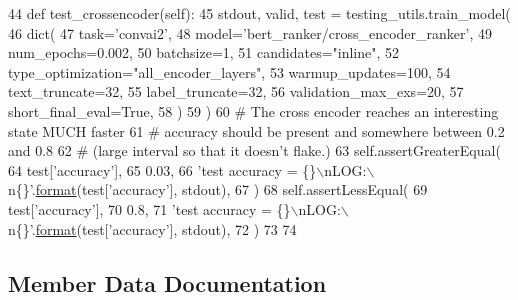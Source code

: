 \begin{DoxyCode}
44     \textcolor{keyword}{def }test\_crossencoder(self):
45         stdout, valid, test = testing\_utils.train\_model(
46             dict(
47                 task=\textcolor{stringliteral}{'convai2'},
48                 model=\textcolor{stringliteral}{'bert\_ranker/cross\_encoder\_ranker'},
49                 num\_epochs=0.002,
50                 batchsize=1,
51                 candidates=\textcolor{stringliteral}{"inline"},
52                 type\_optimization=\textcolor{stringliteral}{"all\_encoder\_layers"},
53                 warmup\_updates=100,
54                 text\_truncate=32,
55                 label\_truncate=32,
56                 validation\_max\_exs=20,
57                 short\_final\_eval=\textcolor{keyword}{True},
58             )
59         )
60         \textcolor{comment}{# The cross encoder reaches an interesting state MUCH faster}
61         \textcolor{comment}{# accuracy should be present and somewhere between 0.2 and 0.8}
62         \textcolor{comment}{# (large interval so that it doesn't flake.)}
63         self.assertGreaterEqual(
64             test[\textcolor{stringliteral}{'accuracy'}],
65             0.03,
66             \textcolor{stringliteral}{'test accuracy = \{\}\(\backslash\)nLOG:\(\backslash\)n\{\}'}.\hyperlink{namespaceparlai_1_1chat__service_1_1services_1_1messenger_1_1shared__utils_a32e2e2022b824fbaf80c747160b52a76}{format}(test[\textcolor{stringliteral}{'accuracy'}], stdout),
67         )
68         self.assertLessEqual(
69             test[\textcolor{stringliteral}{'accuracy'}],
70             0.8,
71             \textcolor{stringliteral}{'test accuracy = \{\}\(\backslash\)nLOG:\(\backslash\)n\{\}'}.\hyperlink{namespaceparlai_1_1chat__service_1_1services_1_1messenger_1_1shared__utils_a32e2e2022b824fbaf80c747160b52a76}{format}(test[\textcolor{stringliteral}{'accuracy'}], stdout),
72         )
73 
74 
\end{DoxyCode}


\subsection{Member Data Documentation}
\mbox{\label{classtest__bert_1_1TestBertModel_af6b428797cdbe20ca87f4b1379235347}} 
